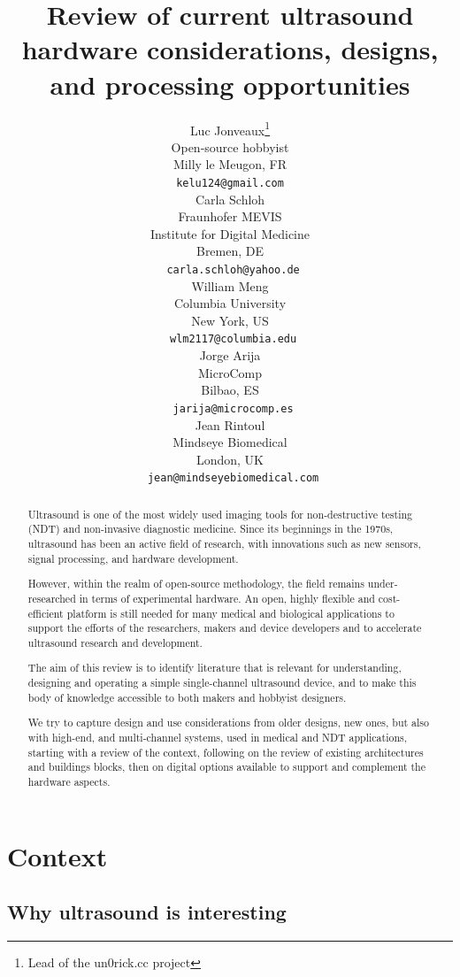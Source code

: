 \documentclass{article}
\title{Review of current ultrasound hardware considerations, designs, and processing opportunities}
\author{
 Luc Jonveaux\thanks{Lead of the un0rick.cc project } \\
 Open-source hobbyist \\
 Milly le Meugon, FR\\
 \texttt{kelu124@gmail.com} \\
 \And
 Carla Schloh \\
 Fraunhofer MEVIS\\
 Institute for Digital Medicine\\
 Bremen, DE\\
 \texttt{ carla.schloh@yahoo.de} \\
\And
 William Meng \\
Columbia University \\
 New York, US\\
 \texttt{ wlm2117@columbia.edu} \\
 \And
 Jorge Arija \\
MicroComp \\
 Bilbao, ES\\
 \texttt{ jarija@microcomp.es} \\
   \And
 Jean Rintoul \\
Mindseye Biomedical \\
 London, UK\\
 \texttt{ jean@mindseyebiomedical.com} \\
 }
\begin{document}
\maketitle

\begin{abstract}

Ultrasound is one of the most widely used imaging tools for non-destructive testing (NDT) and non-invasive diagnostic medicine.
Since its beginnings in the 1970s, ultrasound has been an active field of research,
with innovations such as new sensors, signal processing, and hardware development.

However, within the realm of open-source methodology, the field remains under-researched in terms of experimental hardware.
An open, highly flexible and cost-efficient platform is still needed for many medical and biological applications to support the efforts of the researchers, makers and device developers and to accelerate ultrasound research and development.

The aim of this review is to identify literature that is relevant for understanding, designing and operating a simple single-channel ultrasound device, and to make this body of knowledge accessible to both makers and hobbyist designers.

We try to capture design and use considerations from older designs, new ones, but also with high-end, and multi-channel systems, used in medical and NDT applications, starting with a review of the context, following on the review of existing architectures and buildings blocks, then on digital options available to support and complement the hardware aspects.

\end{abstract}




\newpage


\section{Context}

\subsection{Why ultrasound is interesting}
\end{document}
